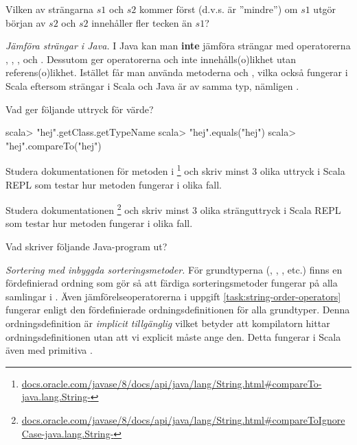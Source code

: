 \Subtask\Pen Vilken av strängarna $s1$ och $s2$ kommer först (d.v.s. är ''mindre'') om $s1$ utgör början av $s2$ och $s2$ innehåller fler tecken än $s1$? 


\Task \emph{Jämföra strängar i Java.} I Java kan man \textbf{inte} jämföra strängar med operatorerna \code{<}, \code{<=}, \code{>}, och \code{>=}. Dessutom ger operatorerna \code{==} och \code{!=} inte innehålls(o)likhet utan referens(o)likhet. Istället får man använda metoderna  och , vilka också fungerar i Scala eftersom strängar i Scala och Java är av samma typ, nämligen .


\Subtask Vad ger följande uttryck för värde?

\begin{REPL}
scala> "hej".getClass.getTypeName
scala> "hej".equals("hej")
scala> "hej".compareTo("hej")
\end{REPL}


\Subtask Studera dokumentationen för metoden  i \footnote{\href{https://docs.oracle.com/javase/8/docs/api/java/lang/String.html\#compareTo-java.lang.String-}{docs.oracle.com/javase/8/docs/api/java/lang/String.html\#compareTo-java.lang.String-}} och skriv minst 3 olika uttryck i Scala REPL som testar hur metoden fungerar i olika fall. 

\Subtask Studera dokumentationen  \footnote{\href{https://docs.oracle.com/javase/8/docs/api/java/lang/String.html\#compareToIgnoreCase-java.lang.String-}{docs.oracle.com/javase/8/docs/api/java/lang/String.html\#compareToIgnoreCase-java.lang.String-}} och skriv minst 3 olika stränguttryck i Scala REPL som testar hur metoden fungerar i olika fall. 

\Subtask Vad skriver följande Java-program ut?


\Task \emph{Sortering med inbyggda sorteringsmetoder.} För grundtyperna (, , , etc.) finns en fördefinierad ordning som gör så att färdiga sorteringsmetoder fungerar på alla samlingar i . Även jämförelseoperatorerna i uppgift \ref{task:string-order-operators} fungerar enligt den fördefinierade ordningsdefinitionen för alla grundtyper. Denna ordningsdefinition är \textit{implicit tillgänglig} vilket betyder att kompilatorn hittar ordningsdefinitionen utan att vi explicit måste ange den. Detta fungerar i Scala även med primitiva .

